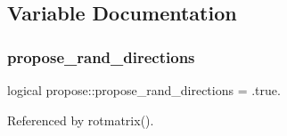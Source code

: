 \subsection{Variable Documentation}
\mbox{\label{namespacepropose_a8617eeb66f67fd9a772122b9d90f4a03}} 
\subsubsection{\texorpdfstring{propose\+\_\+rand\+\_\+directions}{propose\_rand\_directions}}
{\footnotesize\ttfamily logical propose\+::propose\+\_\+rand\+\_\+directions = .true.}



Referenced by rotmatrix().

